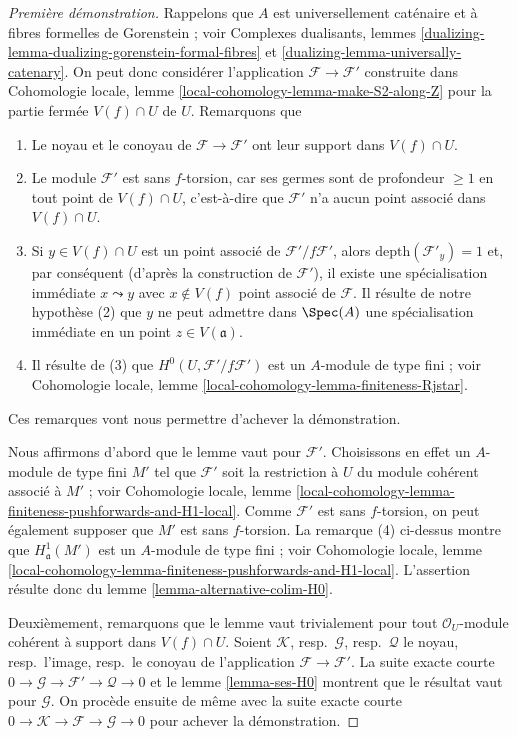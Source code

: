 \begin{proof}[Première démonstration]
Rappelons que $A$ est universellement caténaire et à fibres formelles
de Gorenstein ; voir Complexes dualisants, lemmes
\ref{dualizing-lemma-dualizing-gorenstein-formal-fibres} et
\ref{dualizing-lemma-universally-catenary}. On peut donc considérer l'application
$\mathcal{F} \to \mathcal{F}'$ construite dans
Cohomologie locale, lemme \ref{local-cohomology-lemma-make-S2-along-Z}
pour la partie fermée $V(f) \cap U$ de $U$.
Remarquons que
\begin{enumerate}
\item Le noyau et le conoyau de $\mathcal{F} \to \mathcal{F}'$
ont leur support dans $V(f) \cap U$.
\item Le module $\mathcal{F}'$ est sans $f$-torsion, car ses germes sont de
profondeur $\geq 1$ en tout point de $V(f) \cap U$, c'est-à-dire que $\mathcal{F}'$
n'a aucun point associé dans $V(f) \cap U$.
\item Si $y \in V(f) \cap U$ est un point associé de
$\mathcal{F}'/f\mathcal{F}'$, alors
$\text{depth}(\mathcal{F}'_y) = 1$
et, par conséquent (d'après la construction de $\mathcal{F}'$),
il existe une spécialisation immédiate $x \leadsto y$
avec $x \not \in V(f)$ point associé de $\mathcal{F}$.
Il résulte de notre hypothèse (2) que $y$ ne peut admettre
dans $\Spec(A)$ une spécialisation immédiate
en un point $z \in V(\mathfrak a)$.
\item Il résulte de (3) que $H^0(U, \mathcal{F}'/f\mathcal{F}')$
est un $A$-module de type fini ; voir
Cohomologie locale, lemme \ref{local-cohomology-lemma-finiteness-Rjstar}.
\end{enumerate}
Ces remarques vont nous permettre d'achever la démonstration.

\medskip\noindent
Nous affirmons d'abord que le lemme vaut pour $\mathcal{F}'$.
Choisissons en effet un $A$-module de type fini $M'$ tel que $\mathcal{F}'$
soit la restriction
à $U$ du module cohérent associé à $M'$ ; voir Cohomologie locale,
lemme \ref{local-cohomology-lemma-finiteness-pushforwards-and-H1-local}.
Comme $\mathcal{F}'$ est sans $f$-torsion, on peut également supposer que $M'$
est sans $f$-torsion. La remarque (4) ci-dessus montre que
$H^1_\mathfrak a(M')$ est un $A$-module de type fini ; voir Cohomologie locale,
lemme \ref{local-cohomology-lemma-finiteness-pushforwards-and-H1-local}.
L'assertion résulte donc du lemme \ref{lemma-alternative-colim-H0}.

\medskip\noindent
Deuxièmement, remarquons que le lemme vaut trivialement pour tout
$\mathcal{O}_U$-module cohérent à support dans $V(f) \cap U$.
Soient $\mathcal{K}$, resp.\ $\mathcal{G}$, resp.\ $\mathcal{Q}$
le noyau, resp.\ l'image, resp.\ le conoyau de l'application
$\mathcal{F} \to \mathcal{F}'$.
La suite exacte courte
$0 \to \mathcal{G} \to \mathcal{F}' \to \mathcal{Q} \to 0$
et le lemme \ref{lemma-ses-H0} montrent que le résultat vaut pour
$\mathcal{G}$. On procède ensuite de même avec la suite exacte courte
$0 \to \mathcal{K} \to \mathcal{F} \to \mathcal{G} \to 0$
pour achever la démonstration.
\end{proof}


